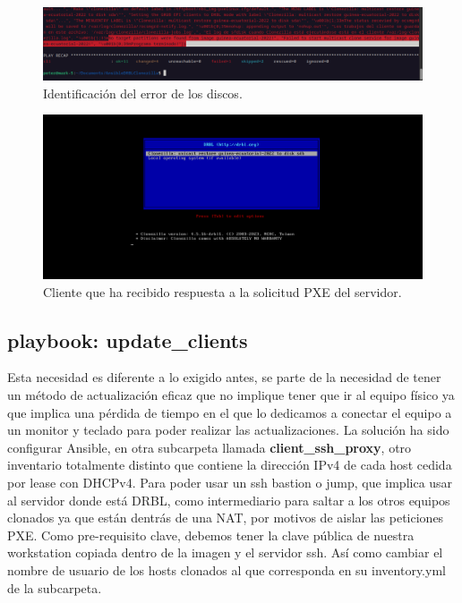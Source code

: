 \begin{figure}[H]
	\centering
	\includegraphics[scale=0.30]{provisioning-ocs/provisioning09}
	\caption{Identificación del error de los discos.}
\end{figure}

\begin{figure}[H]
	\centering
	\includegraphics[scale=0.30]{provisioning-ocs/provisioning10}
	\caption{Cliente que ha recibido respuesta a la solicitud PXE del servidor.}
\end{figure}

\newpage
\subsection{playbook: update\_clients}

Esta necesidad es diferente a lo exigido antes, se parte de la necesidad de tener un método de actualización eficaz que no implique tener que ir al equipo físico
ya que implica una pérdida de tiempo en el que lo dedicamos a conectar el equipo a un monitor y teclado para poder realizar las actualizaciones. 
\vspace{5mm}
La solución ha sido configurar Ansible, en otra subcarpeta llamada \textbf{client\_ssh\_proxy}, otro inventario totalmente distinto que contiene la dirección IPv4 de cada
host cedida por lease con DHCPv4. Para poder usar un ssh bastion o jump, que implica usar al servidor donde está DRBL, como intermediario para saltar a los otros equipos clonados ya que
están dentrás de una NAT, por motivos de aislar las peticiones PXE.
\vspace{5mm}
Como pre-requisito clave, debemos tener la clave pública de nuestra workstation copiada dentro de la imagen y el servidor ssh. Así como cambiar el nombre de usuario de los hosts
clonados al que corresponda en su inventory.yml de la subcarpeta.


